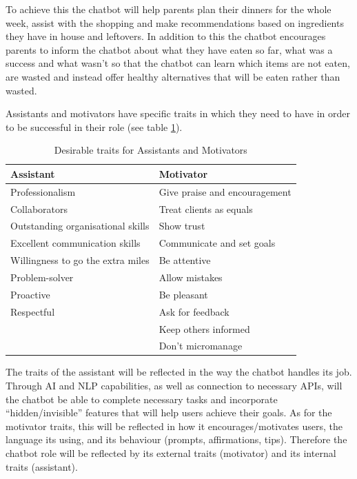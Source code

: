    To achieve this the chatbot will help parents plan their dinners for the whole week, assist with the shopping and make recommendations based on ingredients they have in house and leftovers. In addition to this the chatbot encourages parents to inform the chatbot about what they have eaten so far, what was a success and what wasn’t so that the chatbot can learn which items are not eaten, are wasted and instead offer healthy alternatives that will be eaten rather than wasted. 
    
    Assistants and motivators have specific traits in which they need to have in order to be successful in their role (see table \ref{table:2}).
    
\vspace{2,5mm}

    \begin{table}[h]
    \begin{tabular}{ |p{}||p{}|  }
    \hline
    Assistant & Motivator \\
    \hline
        Professionalism & Give praise and encouragement \\
        Collaborators & Treat clients as equals \\
        Outstanding organisational skills & Show trust \\
        Excellent communication skills & Communicate and set goals \\
        Willingness to go the extra miles & Be attentive \\
        Problem-solver & Allow mistakes \\
        Proactive & Be pleasant \\
        Respectful & Ask for feedback \\
        & Keep others informed \\
        & Don’t micromanage \\
    \hline
    \end{tabular}
    \caption{Desirable traits for Assistants and Motivators}
    \label{table:2}
    \end{table}
 
    The traits of the assistant will be reflected in the way the chatbot handles its job. Through AI and NLP capabilities, as well as connection to necessary APIs, will the chatbot be able to complete necessary tasks and incorporate “hidden/invisible” features that will help users achieve their goals. As for the motivator traits, this will be reflected in how it encourages/motivates users, the language its using, and its behaviour (prompts, affirmations, tips). Therefore the chatbot role will be reflected by its external traits (motivator) and its internal traits (assistant).
    
